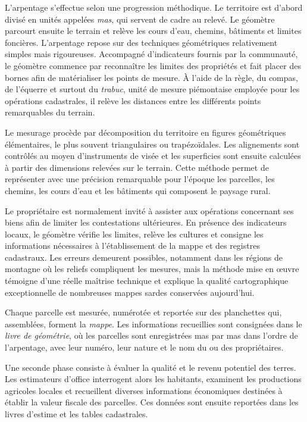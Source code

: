 \documentclass[12pt,a4paper]{report}
\begin{document}
L'arpentage s'effectue selon une progression méthodique. Le territoire est d'abord divisé en unités appelées \emph{mas}, qui servent de cadre au relevé. Le géomètre parcourt ensuite le terrain et relève les cours d'eau, chemins, bâtiments et limites foncières. 
L'arpentage repose sur des techniques géométriques relativement simples mais rigoureuses. Accompagné d'indicateurs fournis par la communauté, le géomètre commence par reconnaître les limites des propriétés et fait placer des bornes afin de matérialiser les points de mesure. À l'aide de la règle, du compas, de l'équerre et surtout du \emph{trabuc}, unité de mesure piémontaise employée pour les opérations cadastrales, il relève les distances entre les différents points remarquables du terrain.

Le mesurage procède par décomposition du territoire en figures géométriques élémentaires, le plus souvent triangulaires ou trapézoïdales. Les alignements sont contrôlés au moyen d'instruments de visée et les superficies sont ensuite calculées à partir des dimensions relevées sur le terrain. Cette méthode permet de représenter avec une précision remarquable pour l'époque les parcelles, les chemins, les cours d'eau et les bâtiments qui composent le paysage rural.

Le propriétaire est normalement invité à assister aux opérations concernant ses biens afin de limiter les contestations ultérieures. En présence des indicateurs locaux, le géomètre vérifie les limites, relève les cultures et consigne les informations nécessaires à l'établissement de la mappe et des registres cadastraux. Les erreurs demeurent possibles, notamment dans les régions de montagne où les reliefs compliquent les mesures, mais la méthode mise en œuvre témoigne d'une réelle maîtrise technique et explique la qualité cartographique exceptionnelle de nombreuses mappes sardes conservées aujourd'hui.

Chaque parcelle est mesurée, numérotée et reportée sur des planchettes qui, assemblées, forment la \emph{mappe}. Les informations recueillies sont consignées dans le \emph{livre de géométrie}, où les parcelles sont enregistrées mas par mas dans l'ordre de l'arpentage, avec leur numéro, leur nature et le nom du ou des propriétaires.

Une seconde phase consiste à évaluer la qualité et le revenu potentiel des terres. Les estimateurs d'office interrogent alors les habitants, examinent les productions agricoles locales et recueillent diverses informations économiques destinées à établir la valeur fiscale des parcelles. Ces données sont ensuite reportées dans les livres d'estime et les tables cadastrales.
\end{document}
